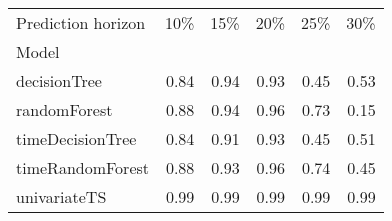 \begin{tabular}{lrrrrr}
\toprule
Prediction horizon & 10\% & 15\% & 20\% & 25\% & 30\% \\
Model &  &  &  &  &  \\
\midrule
decisionTree & 0.84 & 0.94 & 0.93 & 0.45 & 0.53 \\
randomForest & 0.88 & 0.94 & 0.96 & 0.73 & 0.15 \\
timeDecisionTree & 0.84 & 0.91 & 0.93 & 0.45 & 0.51 \\
timeRandomForest & 0.88 & 0.93 & 0.96 & 0.74 & 0.45 \\
univariateTS & 0.99 & 0.99 & 0.99 & 0.99 & 0.99 \\
\bottomrule
\end{tabular}
